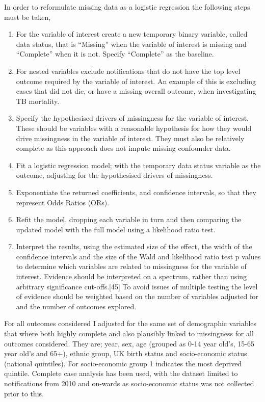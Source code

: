 \documentclass[11pt,twoside]{bristolthesis}
\begin{document}
  In order to reformulate missing data as a logistic regression the following steps must be taken,
  \begin{enumerate}
  \def\labelenumi{\arabic{enumi}.}
  \item
    For the variable of interest create a new temporary binary variable, called data status, that is ``Missing'' when the variable of interest is missing and ``Complete'' when it is not. Specify ``Complete'' as the baseline.
  \item
    For nested variables exclude notifications that do not have the top level outcome required by the variable of interest. An example of this is excluding cases that did not die, or have a missing overall outcome, when investigating TB mortality.
  \item
    Specify the hypothesised drivers of missingness for the variable of interest. These should be variables with a reasonable hypothesis for how they would drive missingness in the variable of interest. They must also be relatively complete as this approach does not impute missing confounder data.
  \item
    Fit a logistic regression model; with the temporary data status variable as the outcome, adjusting for the hypothesised drivers of missingness.
  \item
    Exponentiate the returned coefficients, and confidence intervals, so that they represent Odds Ratios (ORs).
  \item
    Refit the model, dropping each variable in turn and then comparing the updated model with the full model using a likelihood ratio test.
  \item
    Interpret the results, using the estimated size of the effect, the width of the confidence intervals and the size of the Wald and likelihood ratio test p values to determine which variables are related to missingness for the variable of interest. Evidence should be interpreted on a spectrum, rather than using arbitrary significance cut-offs.{[}45{]} To avoid issues of multiple testing the level of evidence should be weighted based on the number of variables adjusted for and the number of outcomes explored.
  \end{enumerate}
  For all outcomes considered I adjusted for the same set of demographic variables that where both highly complete and also plausibly linked to missingness for all outcomes considered. They are; year, sex, age (grouped as 0-14 year old's, 15-65 year old's and 65+), ethnic group, UK birth status and socio-economic status (national quintiles). For socio-economic group 1 indicates the most deprived quintile. Complete case analysis has been used, with the dataset limited to notifications from 2010 and on-wards as socio-economic status was not collected prior to this.
  
\end{document}

